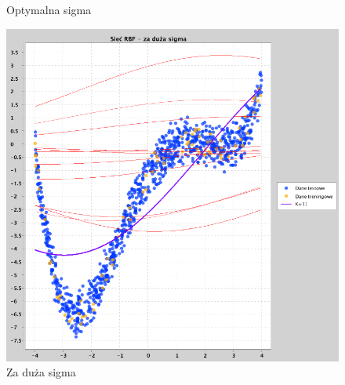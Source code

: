 \documentclass[a4paper, portrait,11pt]{article}
\begin{document}
\begin{figure}[!htb]
\begin{minipage}{0.33\textwidth}
    \caption{Optymalna sigma}
  \end{minipage}
  \begin{minipage}{0.33\textwidth}
    \centering
    \includegraphics[width=1\linewidth]{../data/approximation3/2/big.png}
    \caption{Za duża sigma}
  \end{minipage}\hfill
\end{figure}
\end{document}
